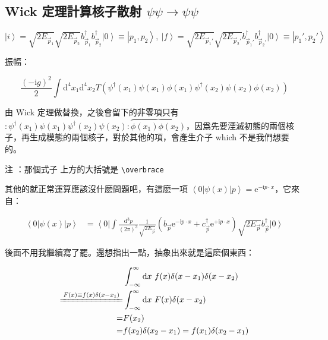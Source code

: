 \documentclass{article}
\begin{document}
\subsection{Wick 定理計算核子散射 $\psi\psi\to\psi\psi$}

$$
  \left|i\right\rangle=\sqrt{2E_{\vec{p}_1}}\sqrt{2E_{\vec{p}_2}}b_{\vec{p}_1}^{\dagger}b_{\vec{p}_2}^{\dagger}\left|0\right\rangle\equiv\left|p_1,p_2\right\rangle,\ \left|f\right\rangle=\sqrt{2E_{\vec{p}_1'}}\sqrt{2E_{\vec{p}_2'}}b_{\vec{p}_1'}^{\dagger}b_{\vec{p}_2'}^{\dagger}\left|0\right\rangle\equiv\left|p_1',p_2'\right\rangle
$$

振幅：

$$
  \frac{(-\mathrm{i}g)^2}{2}\int\mathrm{d}^4x_1\mathrm{d}^4x_2T\left(\psi^{\dagger}(x_1)\psi(x_1)\phi(x_1)\psi^{\dagger}(x_2)\psi(x_2)\phi(x_2)\right)
$$

由 Wick 定理做替換，之後會留下的非零項只有 $:\psi^{\dagger}(x_1)\psi(x_1)\psi^{\dagger}(x_2)\psi(x_2):\overbrace{\phi(x_1)\phi(x_2)}$，因爲先要湮滅初態的兩個核子，再生成模態的兩個核子，對於其他的項，會產生介子 which 不是我們想要的。

注 ：那個式子  上方的大括號是 \texttt{\textbackslash overbrace{}}

其他的就正常運算應該沒什麽問題吧，有這麽一項 $\left\langle0\right|\psi(x)\left|p\right\rangle=\mathrm{e}^{-\mathrm{i}p\cdot x}$，它來自：

$$
  \begin{aligned}
    \left\langle0\right|\psi(x)\left|p\right\rangle & = \left\langle0\right|\int\frac{\mathrm{d}^3p}{(2\pi)^3}\frac{1}{\sqrt{2E_{\vec{p}}}}\left(b_{\vec{p}}\mathrm{e}^{-\mathrm{i}p\cdot x}+c_{\vec{p}}^{\dagger}\mathrm{e}^{+\mathrm{i}p\cdot x}\right)\sqrt{2E_{\vec{p}}}b_{\vec{p}}^{\dagger}\left|0\right\rangle
  \end{aligned}
$$

後面不用我繼續寫了罷。還想指出一點，抽象出來就是這麽個東西：

$$
  \begin{aligned}
                                              & \int_{-\infty}^{\infty}\mathrm{d}x\ f(x)\delta(x-x_1)\delta(x-x_2) \\
    \xlongequal{F(x)\equiv f(x)\delta(x-x_1)} & \int_{-\infty}^{\infty}\mathrm{d}x\ F(x)\delta(x-x_2)              \\
    =                                         & F(x_2)                                                             \\
    =                                         & f(x_2)\delta(x_2-x_1)=f(x_1)\delta(x_2-x_1)
  \end{aligned}
$$
\end{document}

